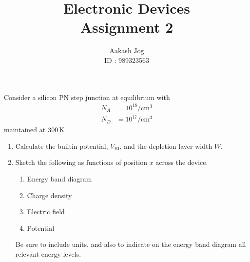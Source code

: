 \documentclass[fleqn, a4paper, 11pt, oneside]{amsart}
\title
[
	Electronic Devices : Assignment 2
]
{
	Electronic Devices\\
	Assignment 2
}
\author
{
	Aakash Jog\\
	ID : 989323563
}
\date{\formatdate{17}{3}{2016}}
\theoremstyle{definition}
\theoremstyle{theorem}
\begin{document}
\maketitle

\begin{question}
	Consider a silicon PN step junction at equilibrium with
	\begin{align*}
		N_A & = 10^{18} \si{\per\centi\metre\cubed} \\
		N_D & = 10^{17} \si{\per\centi\metre\cubed}
	\end{align*}
	maintained at $300 \kelvin$.
	\begin{enumerate}
		\item
			Calculate the builtin potential, $V_{\text{BI}}$, and the depletion layer width $W$.
		\item
			Sketch the following as functions of position $x$ across the device.
			\begin{enumerate}
				\item Energy band diagram
				\item Charge density
				\item Electric field
				\item Potential
			\end{enumerate}
			Be sure to include units, and also to indicate on the energy band diagram all relevant energy levels.
	\end{enumerate}
\end{question}
\end{document}
